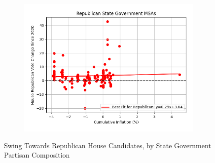 \documentclass{article}
\begin{document}
\begin{figure}[ht]
\begin{subfigure}[b]{0.4\textwidth}
    \centering
    \includegraphics[width=\textwidth]{house_goods_R_msa_swing_scatter.png}
\end{subfigure}
\caption{Swing Towards Republican House Candidates, by State Government Partisan Composition}
\end{figure}
\end{document}
